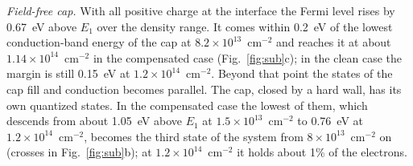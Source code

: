 \documentclass[11pt]{article}
\begin{document}
\emph{Field-free cap.} With all positive charge at the interface the Fermi level rises by 0.67~eV above $E_1$ over the density range. It comes within 0.2~eV of the lowest conduction-band energy of the cap at $8.2\times10^{13}$~cm$^{-2}$ and reaches it at about $1.14\times10^{14}$~cm$^{-2}$ in the compensated case (Fig.~\ref{fig:sub}c); in the clean case the margin is still 0.15~eV at $1.2\times10^{14}$~cm$^{-2}$. Beyond that point the states of the cap fill and conduction becomes parallel. The cap, closed by a hard wall, has its own quantized states. In the compensated case the lowest of them, which descends from about 1.05~eV above $E_1$ at $1.5\times10^{13}$~cm$^{-2}$ to 0.76~eV at $1.2\times10^{14}$~cm$^{-2}$, becomes the third state of the system from $8\times10^{13}$~cm$^{-2}$ on (crosses in Fig.~\ref{fig:sub}b); at $1.2\times10^{14}$~cm$^{-2}$ it holds about 1\% of the electrons.
\end{document}
